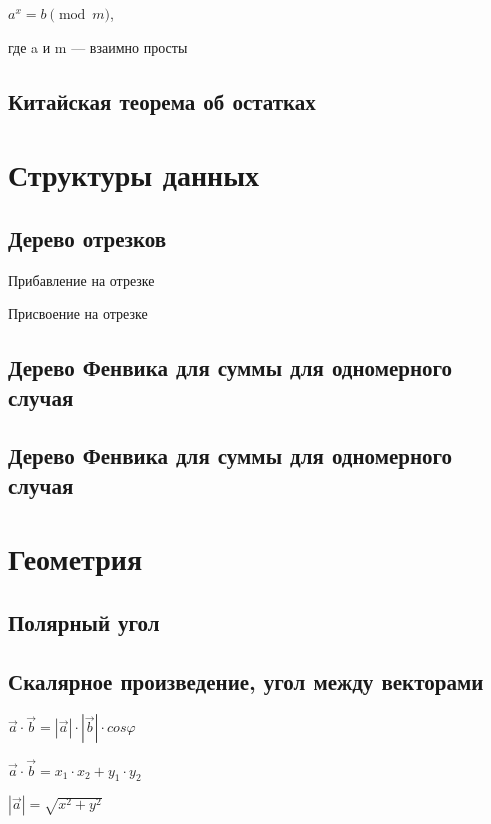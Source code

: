 \documentclass[a4paper]{article}
\begin{document}
\begin{multicols*}{2}
		$a^x = b \pmod m$, 
		
		где a и m — взаимно просты 
		
		\subsection{Китайская теорема об остатках}
		
		
		\section{Структуры данных}
		\subsection{Дерево отрезков}
		
		 Прибавление на отрезке
		 
		 Присвоение на отрезке
		 
		 \subsection{Дерево Фенвика для суммы для одномерного случая}
		 		 
		 \subsection{Дерево Фенвика для суммы для одномерного случая}
		 
		 
		 \section{Геометрия}
		 \subsection{Полярный угол}
		 
		 \subsection{Скалярное произведение, угол между векторами}
		 
		 $\vec a \cdot \vec b = |\vec a| \cdot |\vec b| \cdot cos \varphi$
		 
		 $\vec a \cdot \vec b = x_1 \cdot x_2 + y_1 \cdot y_2$
		 
		 $|\vec a| = \sqrt{x^2 + y^2}$
		 

\end{multicols*}
\end{document}
